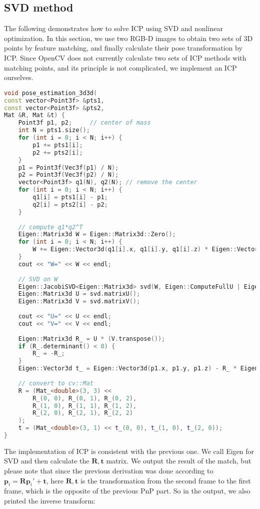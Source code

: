 \subsection{SVD method}
The following demonstrates how to solve ICP using SVD and nonlinear optimization. In this section, we use two RGB-D images to obtain two sets of 3D points by feature matching, and finally calculate their pose transformation by ICP. Since OpenCV does not currently calculate two sets of ICP methods with matching points, and its principle is not complicated, we implement an ICP ourselves.
\begin{lstlisting}[language=c++,caption=slambook2/ch7/pose\_estimation\_3d3d.cpp（片段）]
void pose_estimation_3d3d(
const vector<Point3f> &pts1,
const vector<Point3f> &pts2,
Mat &R, Mat &t) {
	Point3f p1, p2;     // center of mass
	int N = pts1.size();
	for (int i = 0; i < N; i++) {
		p1 += pts1[i];
		p2 += pts2[i];
	}
	p1 = Point3f(Vec3f(p1) / N);
	p2 = Point3f(Vec3f(p2) / N);
	vector<Point3f> q1(N), q2(N); // remove the center
	for (int i = 0; i < N; i++) {
		q1[i] = pts1[i] - p1;
		q2[i] = pts2[i] - p2;
	}
	
	// compute q1*q2^T
	Eigen::Matrix3d W = Eigen::Matrix3d::Zero();
	for (int i = 0; i < N; i++) {
		W += Eigen::Vector3d(q1[i].x, q1[i].y, q1[i].z) * Eigen::Vector3d(q2[i].x, q2[i].y, q2[i].z).transpose();
	}
	cout << "W=" << W << endl;
	
	// SVD on W
	Eigen::JacobiSVD<Eigen::Matrix3d> svd(W, Eigen::ComputeFullU | Eigen::ComputeFullV);
	Eigen::Matrix3d U = svd.matrixU();
	Eigen::Matrix3d V = svd.matrixV();
	
	cout << "U=" << U << endl;
	cout << "V=" << V << endl;
	
	Eigen::Matrix3d R_ = U * (V.transpose());
	if (R_.determinant() < 0) {
		R_ = -R_;
	}
	Eigen::Vector3d t_ = Eigen::Vector3d(p1.x, p1.y, p1.z) - R_ * Eigen::Vector3d(p2.x, p2.y, p2.z);
	
	// convert to cv::Mat
	R = (Mat_<double>(3, 3) <<
		R_(0, 0), R_(0, 1), R_(0, 2),
		R_(1, 0), R_(1, 1), R_(1, 2),
		R_(2, 0), R_(2, 1), R_(2, 2)
	);
	t = (Mat_<double>(3, 1) << t_(0, 0), t_(1, 0), t_(2, 0));
}
\end{lstlisting}

The implementation of ICP is consistent with the previous one. We call Eigen for SVD and then calculate the $\bm{R}, \bm{t}$ matrix. We output the result of the match, but please note that since the previous derivation was done according to $\bm{p}_i = \bm{R} \bm{p}_i' + \bm{t}$, here $\bm{R}, \bm{t}$ is the transformation from the second frame to the first frame, which is the opposite of the previous PnP part. So in the output, we also printed the inverse transform:

